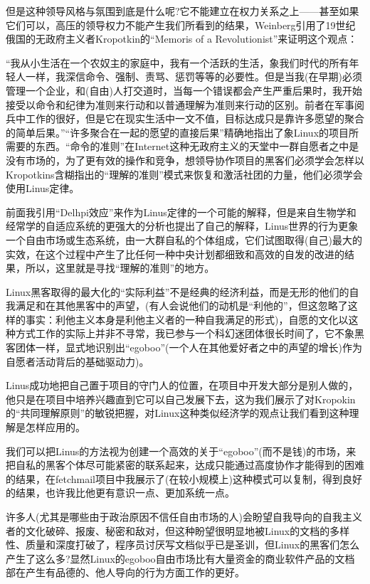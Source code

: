 \documentclass[a4paper,12pt,UTF8,twoside]{ctexbook}
\begin{document}
但是这种领导风格与氛围到底是什么呢?它不能建立在权力关系之上——甚至如果它们可以，高压的领导权力不能产生我们所看到的结果，Weinberg引用了19世纪俄国的无政府主义者Kropotkin的“Memoris of a Revolutionist”来证明这个观点：


“我从小生活在一个农奴主的家庭中，我有一个活跃的生活，象我们时代的所有年轻人一样，我深信命令、强制、责骂、惩罚等等的必要性。但是当我(在早期)必须管理一个企业，和(自由)人打交道时，当每一个错误都会产生严重后果时，我开始接受以命令和纪律为准则来行动和以普通理解为准则来行动的区别。前者在军事阅兵中工作的很好，但是它在现实生活中一文不值，目标达成只是靠许多愿望的聚合的简单后果。”“许多聚合在一起的愿望的直接后果”精确地指出了象Linux的项目所需要的东西。“命令的准则”在Internet这种无政府主义的天堂中一群自愿者之中是没有市场的，为了更有效的操作和竞争，想领导协作项目的黑客们必须学会怎样以Kropotkins含糊指出的“理解的准则”模式来恢复和激活社团的力量，他们必须学会使用Linus定律。


前面我引用“Delhpi效应”来作为Linus定律的一个可能的解释，但是来自生物学和经常学的自适应系统的更强大的分析也提出了自己的解释，Linus世界的行为更象一个自由市场或生态系统，由一大群自私的个体组成，它们试图取得(自己)最大的实效，在这个过程中产生了比任何一种中央计划都细致和高效的自发的改进的结果，所以，这里就是寻找“理解的准则”的地方。


Linux黑客取得的最大化的“实际利益”不是经典的经济利益，而是无形的他们的自我满足和在其他黑客中的声望，(有人会说他们的动机是“利他的”，但这忽略了这样的事实：利他主义本身是利他主义者的一种自我满足的形式)，自愿的文化以这种方式工作的实际上并非不寻常，我已参与一个科幻迷团体很长时间了，它不象黑客团体一样，显式地识别出“egoboo”(一个人在其他爱好者之中的声望的增长)作为自愿者活动背后的基础驱动力)。


Linus成功地把自己置于项目的守门人的位置，在项目中开发大部分是别人做的，他只是在项目中培养兴趣直到它可以自己发展下去，这为我们展示了对Kropokin的“共同理解原则”的敏锐把握，对Linux这种类似经济学的观点让我们看到这种理解是怎样应用的。


我们可以把Linus的方法视为创建一个高效的关于“egoboo”(而不是钱)的市场，来把自私的黑客个体尽可能紧密的联系起来，达成只能通过高度协作才能得到的困难的结果，在fetchmail项目中我展示了(在较小规模上)这种模式可以复制，得到良好的结果，也许我比他更有意识一点、更加系统一点。


许多人(尤其是哪些由于政治原因不信任自由市场的人)会盼望自我导向的自我主义者的文化破碎、报废、秘密和敌对，但这种盼望很明显地被Linux的文档的多样性、质量和深度打破了，程序员讨厌写文档似乎已是圣训，但Linux的黑客们怎么产生了这么多?显然Linux的egoboo自由市场比有大量资金的商业软件产品的文档部在产生有品德的、他人导向的行为方面工作的更好。
\end{document}
